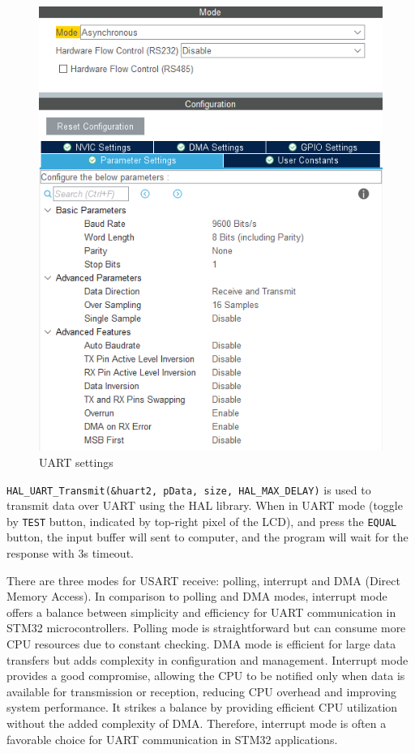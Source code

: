 \documentclass[a4paper, twoside]{report}
\begin{document}
\begin{figure}[H]
    \centering
    \includegraphics[scale=0.7]{Software/UART_settings.png}
    \caption{UART settings}
\end{figure}

\texttt{HAL_UART_Transmit(&huart2, pData, size, HAL_MAX_DELAY)} is used to transmit data over UART using the HAL library. When in UART mode (toggle by \texttt{TEST} button, indicated by top-right pixel of the LCD), and press the \texttt{EQUAL} button, the input buffer will sent to computer, and the program will wait for the response with 3s timeout.

There are three modes for USART receive: polling, interrupt and DMA (Direct Memory Access). In comparison to polling and DMA modes, interrupt mode offers a balance between simplicity and efficiency for UART communication in STM32 microcontrollers. Polling mode is straightforward but can consume more CPU resources due to constant checking. DMA mode is efficient for large data transfers but adds complexity in configuration and management. Interrupt mode provides a good compromise, allowing the CPU to be notified only when data is available for transmission or reception, reducing CPU overhead and improving system performance. It strikes a balance by providing efficient CPU utilization without the added complexity of DMA. Therefore, interrupt mode is often a favorable choice for UART communication in STM32 applications.
\end{document}
